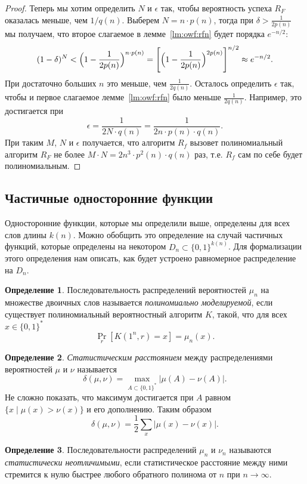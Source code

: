 \documentclass[12pt]{article}
\newcommand{\bits}{\{0,1\}}
\newcommand{\bitstr}{\bits^*}
\theoremstyle{definition}
\newtheorem{definition}{Определение}[section]
\theoremstyle{plain}
\theoremstyle{remark}
\begin{document}
\begin{proof}
Теперь мы хотим определить $N$ и $\epsilon$ так, чтобы вероятность успеха $R_F$ оказалась
меньше, чем $1/q(n)$. Выберем $N = n\cdot p(n)$, тогда при $\delta > \frac{1}{2p(n)}$ мы получаем, 
что второе слагаемое в лемме~\ref{lm:owf:rfn} будет порядка $e^{-n/2}$:
$$(1 - \delta)^N < \Bigl (1 - \frac{1}{2p(n)}  \Bigr)^{n\cdot p(n)} 
= \Biggl[\Bigl(1 - \frac{1}{2p(n)}  \Bigr)^{2p(n)}\Biggr]^{n/2} \approx e^{-n/2}.$$
При достаточно больших $n$ это меньше, чем $\frac{1}{2q(n)}$.
Осталось определить $\epsilon$ так, чтобы и первое слагаемое лемме~\ref{lm:owf:rfn}
было меньше $\frac{1}{2q(n)}$. Например, это достигается при
$$\epsilon = \frac{1}{2N\cdot q(n)} = \frac{1}{2n\cdot p(n)\cdot q(n)}.$$
При таким $M$, $N$ и $\epsilon$ получается, что алгоритм $R_f$ вызовет
полиномиальный алгоритм $R_F$ не более $M\cdot N = 2n^3\cdot p^2(n)\cdot q(n)$ раз,
т.е. $R_f$ сам по себе будет полиномиальным.

\end{proof}


\subsection{Частичные односторонние функции}
Односторонние функции, которые мы определили выше, определены
для всех слов длины $k(n)$. Можно обобщить это определение на
случай частичных функций, которые определены на некотором 
$D_n\subset\bits^{k(n)}$.
Для формализации этого определения нам описать, как будет
устроено равномерное распределение на $D_n$.

\begin{definition}
Последовательность распределений вероятностей $\mu_n$ 
на множестве двоичных слов называется \emph{полиномиально 
моделируемой}, если существует полиномиальный вероятностный
алгоритм $K$, такой, что для всех $x\in\bitstr$
$$\Pr_r[K(1^n, r) = x] = \mu_n(x).$$
\end{definition}

\begin{definition}
\emph{Статистическим расстоянием} между распределениями
вероятностей $\mu$ и $\nu$ называется
$$\delta(\mu,\nu) = \max_{A\subset\bitstr}|\mu(A) - \nu(A)|.$$
Не сложно показать, что максимум достигается при $A$ равном 
$\{x \mid \mu(x) > \nu(x)\}$ и его дополнению.
Таким образом 
$$\delta(\mu,\nu) = \frac12\sum_{x} |\mu(x) - \nu(x)|.$$
\end{definition}

\begin{definition}
Последовательности распределений $\mu_n$ и $\nu_n$ называются
\emph{статистически неотличимыми}, если статистическое расстояние
между ними стремится к нулю быстрее любого обратного полинома от $n$
при $n\to\infty$. 
\end{definition}
\end{document}
